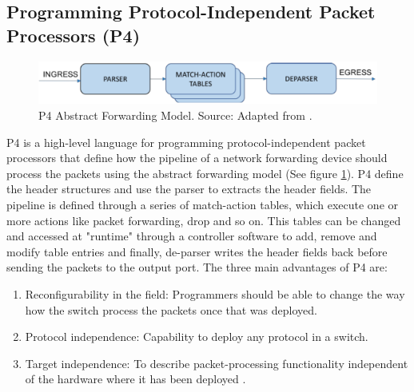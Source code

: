 \subsection{Programming Protocol-Independent Packet Processors (P4)}
\begin{figure}[!h]
	\centering
	\includegraphics[width=0.7\linewidth]{figures/p4_dp.png}
	\caption{P4 Abstract Forwarding Model. Source: Adapted from \cite{P4}.}
	\label{fig:p4_dp}
\end{figure}
P4 is a high-level language for programming protocol-independent packet processors that define how the pipeline of a network forwarding device should process the packets using the abstract forwarding model (See figure \ref{fig:p4_dp}). P4 define the header structures and use the parser to extracts the header fields. The pipeline is defined through a series of match-action tables, which execute one or more actions like packet forwarding, drop and so on.  This tables can be changed and accessed at "runtime" through a controller software to add, remove and modify table entries and finally, de-parser writes the header fields back before sending the packets to the output port. The three main advantages of P4 are:

\begin{enumerate}
\item Reconfigurability in the field: Programmers should be able to change the way how the switch process the packets once that was deployed. 
\item Protocol independence: Capability to deploy any protocol in a switch.  
\item Target independence: To describe packet-processing functionality independent of the hardware where it has been deployed \cite{P4}.
\end{enumerate}

